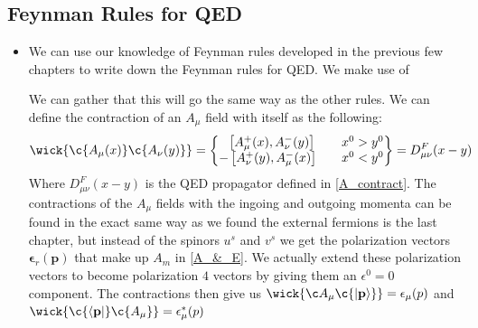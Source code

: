 \documentclass[11pt]{article}
\numberwithin{equation}{section}
\begin{document}
\subsection{Feynman Rules for QED} %
\label{sub:feynman_rules_for_qed}
\begin{itemize}
  \item We can use our knowledge of Feynman rules developed in the previous few chapters to write down the Feynman rules for QED. We make use of  

  We can gather that this will go the same way as the other rules. We can define the contraction of an $A_{\mu}$ field with itself as the following:
\begin{align*}
  \wick{\c {A_{\mu}(x)}\c{A_{\nu}(y)}} = \left\{\begin{matrix}
         ~~\left[A^{+}_{\mu}(x),A^{-}_{\nu}(y)\right]& ~~~x^0>y^0 \\
         -\left[A^{+}_{\nu}(y),A^{-}_{\mu}(x)\right]& ~~~x^0<y^0 
         \end{matrix}\right\} = D^F_{\mu\nu}(x-y)
\end{align*}
  Where $D^F_{\mu\nu}(x-y)$ is the QED propagator defined in \ref{A_contract}. The contractions of the $A_{\mu}$ fields with the ingoing and outgoing momenta can be found in the exact same way as we found the external fermions is the last chapter, but instead of the spinors $u^s$ and $v^s$ we get the polarization vectors $\boldsymbol{\epsilon}_{r}(\textbf{p})$ that make up $A_{m}$ in \ref{A_&_E}. We actually extend these polarization vectors to become polarization $4$ vectors by giving them an $\epsilon^{0}=0$ component. The contractions then give us $\wick{\c A_{\mu} \c{\ket{\textbf{p}}}} = \epsilon_{\mu}(p)$ and $\wick{\c{\bra{\textbf{p}}} \c {A_{\mu}} } = \epsilon^{\ast}_{\mu}(p)$



\end{itemize}
\end{document}
